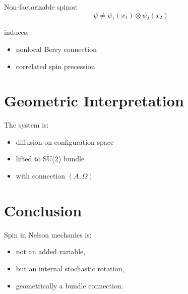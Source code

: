 \documentclass[11pt]{article}
\begin{document}
Non-factorizable spinor:
\begin{equation}
\psi \neq \psi_1(x_1)\otimes \psi_2(x_2)
\end{equation}

induces:

\begin{itemize}
\item nonlocal Berry connection
\item correlated spin precession
\end{itemize}

\section{Geometric Interpretation}

The system is:

\begin{itemize}
\item diffusion on configuration space
\item lifted to SU(2) bundle
\item with connection $(A, \Omega)$
\end{itemize}

\section{Conclusion}

Spin in Nelson mechanics is:

\begin{itemize}
\item not an added variable,
\item but an internal stochastic rotation,
\item geometrically a bundle connection.
\end{itemize}
\end{document}
